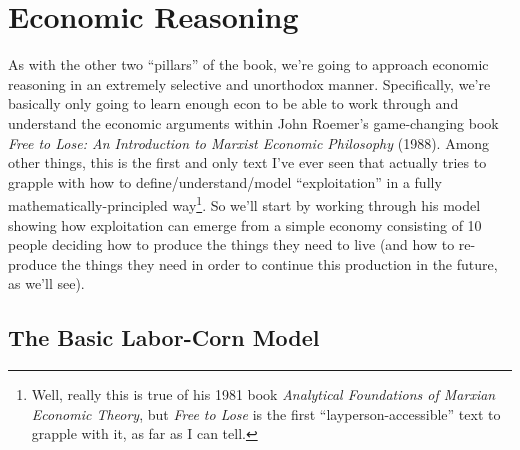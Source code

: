 \section{Economic Reasoning}

As with the other two ``pillars'' of the book, we're going to approach economic reasoning in an extremely selective and unorthodox manner. Specifically, we're basically only going to learn enough econ to be able to work through and understand the economic arguments within John Roemer's game-changing book \textit{Free to Lose: An Introduction to Marxist Economic Philosophy} (1988). Among other things, this is the first and only text I've ever seen that actually tries to grapple with how to define/understand/model ``exploitation'' in a fully mathematically-principled way\footnote{Well, really this is true of his 1981 book \textit{Analytical Foundations of Marxian Economic Theory}, but \textit{Free to Lose} is the first ``layperson-accessible'' text to grapple with it, as far as I can tell.}. So we'll start by working through his model showing how exploitation can emerge from a simple economy consisting of 10 people deciding how to produce the things they need to live (and how to re-produce the things they need in order to continue this production in the future, as we'll see).

\subsection{The Basic Labor-Corn Model}

